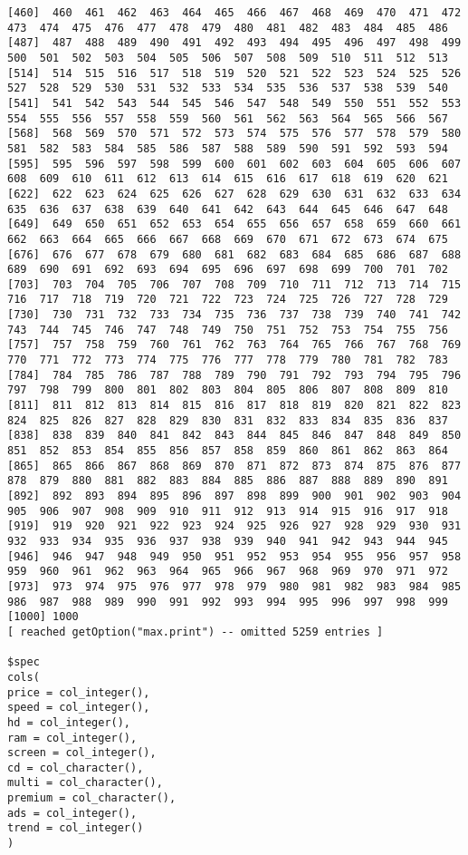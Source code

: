 \begin{lstlisting}
[460]  460  461  462  463  464  465  466  467  468  469  470  471  472  473  474  475  476  477  478  479  480  481  482  483  484  485  486
[487]  487  488  489  490  491  492  493  494  495  496  497  498  499  500  501  502  503  504  505  506  507  508  509  510  511  512  513
[514]  514  515  516  517  518  519  520  521  522  523  524  525  526  527  528  529  530  531  532  533  534  535  536  537  538  539  540
[541]  541  542  543  544  545  546  547  548  549  550  551  552  553  554  555  556  557  558  559  560  561  562  563  564  565  566  567
[568]  568  569  570  571  572  573  574  575  576  577  578  579  580  581  582  583  584  585  586  587  588  589  590  591  592  593  594
[595]  595  596  597  598  599  600  601  602  603  604  605  606  607  608  609  610  611  612  613  614  615  616  617  618  619  620  621
[622]  622  623  624  625  626  627  628  629  630  631  632  633  634  635  636  637  638  639  640  641  642  643  644  645  646  647  648
[649]  649  650  651  652  653  654  655  656  657  658  659  660  661  662  663  664  665  666  667  668  669  670  671  672  673  674  675
[676]  676  677  678  679  680  681  682  683  684  685  686  687  688  689  690  691  692  693  694  695  696  697  698  699  700  701  702
[703]  703  704  705  706  707  708  709  710  711  712  713  714  715  716  717  718  719  720  721  722  723  724  725  726  727  728  729
[730]  730  731  732  733  734  735  736  737  738  739  740  741  742  743  744  745  746  747  748  749  750  751  752  753  754  755  756
[757]  757  758  759  760  761  762  763  764  765  766  767  768  769  770  771  772  773  774  775  776  777  778  779  780  781  782  783
[784]  784  785  786  787  788  789  790  791  792  793  794  795  796  797  798  799  800  801  802  803  804  805  806  807  808  809  810
[811]  811  812  813  814  815  816  817  818  819  820  821  822  823  824  825  826  827  828  829  830  831  832  833  834  835  836  837
[838]  838  839  840  841  842  843  844  845  846  847  848  849  850  851  852  853  854  855  856  857  858  859  860  861  862  863  864
[865]  865  866  867  868  869  870  871  872  873  874  875  876  877  878  879  880  881  882  883  884  885  886  887  888  889  890  891
[892]  892  893  894  895  896  897  898  899  900  901  902  903  904  905  906  907  908  909  910  911  912  913  914  915  916  917  918
[919]  919  920  921  922  923  924  925  926  927  928  929  930  931  932  933  934  935  936  937  938  939  940  941  942  943  944  945
[946]  946  947  948  949  950  951  952  953  954  955  956  957  958  959  960  961  962  963  964  965  966  967  968  969  970  971  972
[973]  973  974  975  976  977  978  979  980  981  982  983  984  985  986  987  988  989  990  991  992  993  994  995  996  997  998  999
[1000] 1000
[ reached getOption("max.print") -- omitted 5259 entries ]

$spec
cols(
price = col_integer(),
speed = col_integer(),
hd = col_integer(),
ram = col_integer(),
screen = col_integer(),
cd = col_character(),
multi = col_character(),
premium = col_character(),
ads = col_integer(),
trend = col_integer()
)

\end{lstlisting}

